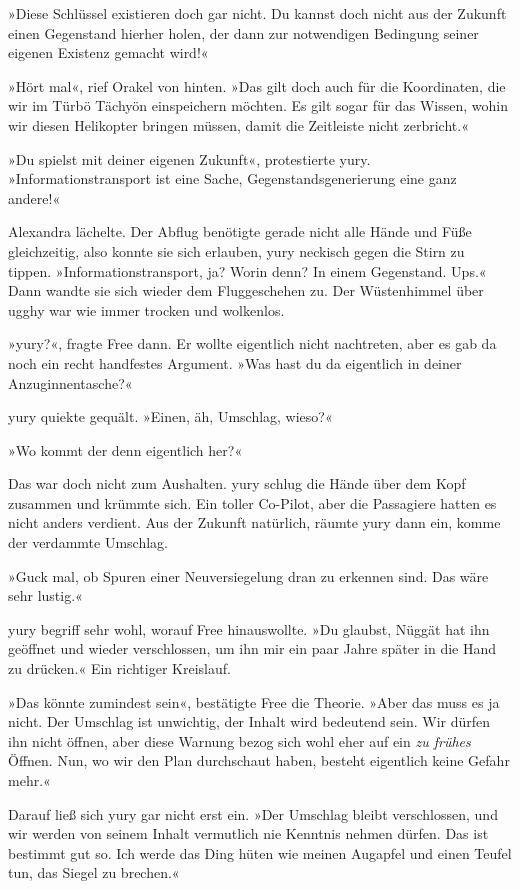 »Diese Schlüssel existieren doch gar nicht. Du kannst doch nicht aus der Zukunft einen Gegenstand hierher holen, der dann zur notwendigen Bedingung seiner eigenen Existenz gemacht wird!«

»Hört mal«, rief Orakel von hinten. »Das gilt doch auch für die Koordinaten, die wir im Türbö Tächyön einspeichern möchten. Es gilt sogar für das Wissen, wohin wir diesen Helikopter bringen müssen, damit die Zeitleiste nicht zerbricht.«

»Du spielst mit deiner eigenen Zukunft«, protestierte yury. »Informationstransport ist eine Sache, Gegenstandsgenerierung eine ganz andere!«

Alexandra lächelte. Der Abflug benötigte gerade nicht alle Hände und Füße gleichzeitig, also konnte sie sich erlauben, yury neckisch gegen die Stirn zu tippen. »Informationstransport, ja? Worin denn? In einem Gegenstand. Ups.« Dann wandte sie sich wieder dem Fluggeschehen zu. Der Wüstenhimmel über ugghy war wie immer trocken und wolkenlos.

»yury?«, fragte Free dann. Er wollte eigentlich nicht nachtreten, aber es gab da noch ein recht handfestes Argument. »Was hast du da eigentlich in deiner Anzuginnentasche?«

yury quiekte gequält. »Einen, äh, Umschlag, wieso?«

»Wo kommt der denn eigentlich her?«

Das war doch nicht zum Aushalten. yury schlug die Hände über dem Kopf zusammen und krümmte sich. Ein toller Co-Pilot, aber die Passagiere hatten es nicht anders verdient. Aus der Zukunft natürlich, räumte yury dann ein, komme der verdammte Umschlag.

»Guck mal, ob Spuren einer Neuversiegelung dran zu erkennen sind. Das wäre sehr lustig.«

yury begriff sehr wohl, worauf Free hinauswollte. »Du glaubst, Nüggät hat ihn geöffnet und wieder verschlossen, um ihn mir ein paar Jahre später in die Hand zu drücken.« Ein richtiger Kreislauf.

»Das könnte zumindest sein«, bestätigte Free die Theorie. »Aber das muss es ja nicht. Der Umschlag ist unwichtig, der Inhalt wird bedeutend sein. Wir dürfen ihn nicht öffnen, aber diese Warnung bezog sich wohl eher auf ein \emph{zu frühes} Öffnen. Nun, wo wir den Plan durchschaut haben, besteht eigentlich keine Gefahr mehr.«

Darauf ließ sich yury gar nicht erst ein. »Der Umschlag bleibt verschlossen, und wir werden von seinem Inhalt vermutlich nie Kenntnis nehmen dürfen. Das ist bestimmt gut so. Ich werde das Ding hüten wie meinen Augapfel und einen Teufel tun, das Siegel zu brechen.«


